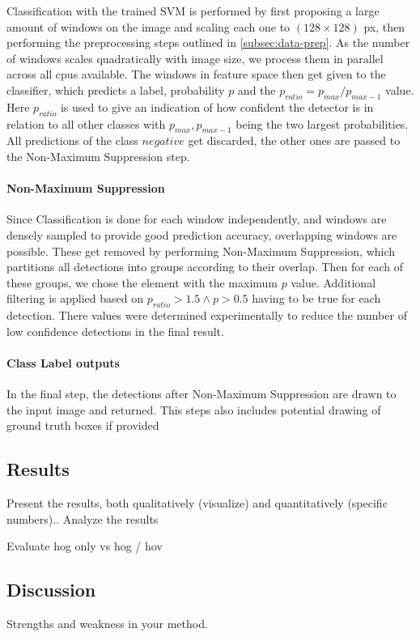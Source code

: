 \documentclass[11pt]{article}
\begin{document}
Classification with the trained SVM is performed by first proposing a large amount of windows on the image and scaling each one to 
\( (128 \times 128) \) px, then performing the preprocessing steps outlined in \autoref{subsec:data-prep}. As the number of windows scales quadratically 
with image size, we process them in parallel across all cpus available. The windows in feature space then get given to the classifier, which predicts a label, probability \( p \) and the
\( p_{ratio} = p_{max} / p_{max - 1} \) value. Here \( p_{ratio} \) is used to give an indication of how confident the detector is in relation to all other classes with \( p_{max}, p_{max-1} \) being the two largest probabilities.
All predictions of the class \( negative \) get discarded, the other ones are passed to the Non-Maximum Suppression step.


\paragraph{Non-Maximum Suppression}
Since Classification is done for each window independently, and windows are densely sampled to provide good prediction accuracy, 
overlapping windows are possible. These get removed by performing Non-Maximum Suppression, which partitions all detections into groups according to their overlap.
Then for each of these groups, we chose the element with the maximum \( p \) value. Additional filtering is applied based on \( p_{ratio} > 1.5 \wedge p > 0.5 \) having to be true for each detection.
There values were determined experimentally to reduce the number of low confidence detections in the final result.

\paragraph{Class Label outputs}
In the final step, the detections after Non-Maximum Suppression are drawn to the input image and returned. 
This steps also includes potential drawing of ground truth boxes if provided

\subsection{Results}\label{subsec:results}
Present the results, both qualitatively (visualize) and quantitatively (specific numbers)..
Analyze the results

Evaluate hog only vs hog / hov
\subsection{Discussion}
Strengths and weakness in your method.
\end{document}
